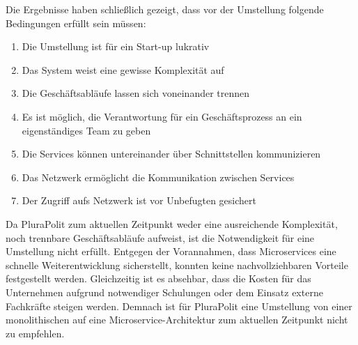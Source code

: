 Die Ergebnisse haben schließlich gezeigt, dass vor der Umstellung folgende Bedingungen erfüllt sein müssen:
\begin{enumerate}
	\item Die Umstellung ist für ein Start-up lukrativ
	\item Das System weist eine gewisse Komplexität auf
	\item Die Geschäftsabläufe lassen sich voneinander trennen
	\item Es ist möglich, die Verantwortung für ein Geschäftsprozess an ein eigenständiges Team zu geben
	\item Die Services können untereinander über Schnittstellen kommunizieren
	\item Das Netzwerk ermöglicht die Kommunikation zwischen Services
	\item Der Zugriff aufs Netzwerk ist vor Unbefugten gesichert
\end{enumerate}

Da PluraPolit zum aktuellen Zeitpunkt weder eine ausreichende Komplexität, noch trennbare Geschäftsabläufe aufweist, ist die Notwendigkeit für eine Umstellung nicht erfüllt.
Entgegen der Vorannahmen, dass Microservices eine schnelle Weiterentwicklung sicherstellt, konnten keine nachvollziehbaren Vorteile festgestellt werden. Gleichzeitig ist es absehbar, dass die Kosten für das Unternehmen aufgrund notwendiger Schulungen oder dem Einsatz externe Fachkräfte steigen werden.
Demnach ist für PluraPolit eine Umstellung von einer monolithischen auf eine Microservice-Architektur zum aktuellen Zeitpunkt nicht zu empfehlen.
